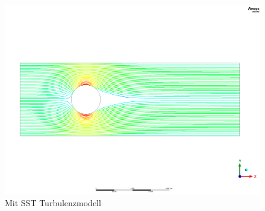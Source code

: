 \begin{refsection}
\begin{figure}
    \includegraphics[width=\textwidth]{papers/reynolds/images/sst.png}
    \caption{Mit SST Turbulenzmodell}
    \label{fig:SST}
\end{figure}



% 
% 
% 

\printbibliography[heading=subbibliography]
\end{refsection}
